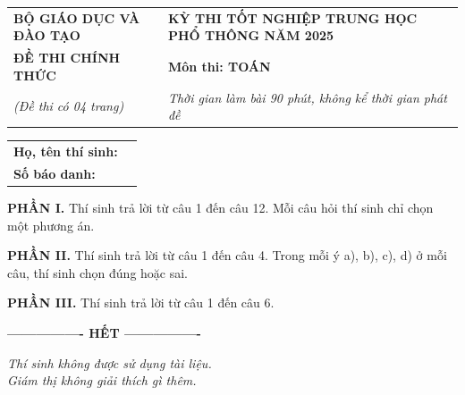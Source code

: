 \documentclass[12pt,a4paper]{article}
\newcommand{\made}{0101}
\newcounter{cau}
\newcommand{\phan}[2]{%
  \vspace{6pt}
  \par\noindent\textbf{PHẦN #1.} #2
  \vspace{3pt}
}
\newcommand{\omade}{%
\begin{tikzpicture}
\node[
  draw,
  minimum width=31mm,
  minimum height=8mm,
  inner sep=0pt
]
{\textbf{Mã đề: \made}};
\end{tikzpicture}
}
\newcommand{\tieudethi}{%
\begin{center}
\begin{tabularx}{\textwidth}{>{\centering\arraybackslash}X>{\centering\arraybackslash}X}
\textbf{BỘ GIÁO DỤC VÀ ĐÀO TẠO}
&
\textbf{KỲ THI TỐT NGHIỆP TRUNG HỌC PHỔ THÔNG NĂM 2025}
\\
\textbf{ĐỀ THI CHÍNH THỨC}
&
\textbf{Môn thi: TOÁN}
\\
\textit{(Đề thi có 04 trang)}
&
\textit{Thời gian làm bài 90 phút, không kể thời gian phát đề}
\end{tabularx}
\end{center}

\vspace{4pt}

\begin{tabularx}{\textwidth}{X r}
\textbf{Họ, tên thí sinh:} \dotfill & \multirow{2}{*}{\omade} \\
\textbf{Số báo danh:} \dotfill &
\end{tabularx}

\vspace{8pt}
}
\begin{document}
\tieudethi

\phan{I}{Thí sinh trả lời từ câu 1 đến câu 12. Mỗi câu hỏi thí sinh chỉ chọn một phương án.}


\phan{II}{Thí sinh trả lời từ câu 1 đến câu 4. Trong mỗi ý a), b), c), d) ở mỗi câu, thí sinh chọn đúng hoặc sai.}
\setcounter{cau}{0}


\phan{III}{Thí sinh trả lời từ câu 1 đến câu 6.}
\setcounter{cau}{0}


\vfill

\begin{center}
\textbf{---------------- HẾT ----------------}
\end{center}

\textit{Thí sinh không được sử dụng tài liệu.}\\
\textit{Giám thị không giải thích gì thêm.}
\end{document}
